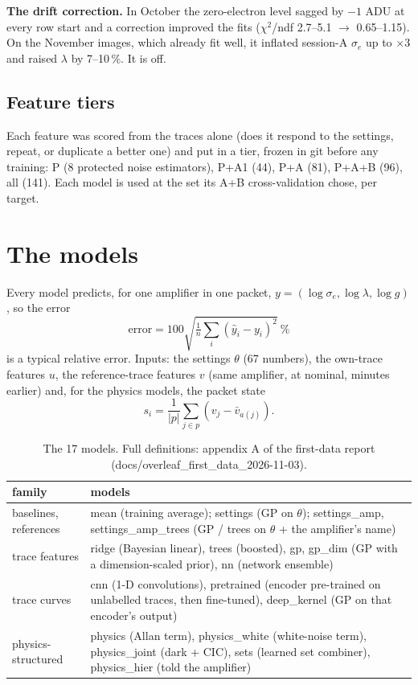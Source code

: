 \documentclass[11pt]{article}
\begin{document}
\textbf{The drift correction.} In October the zero-electron level sagged by $-1$ ADU at every row start and a
correction improved the fits ($\chi^2$/ndf 2.7--5.1 $\to$ 0.65--1.15). On the November images, which already fit well,
it inflated session-A $\sigma_e$ up to $\times3$ and raised $\lambda$ by 7--10\,\%. It is off.

\subsection{Feature tiers}
Each feature was scored from the traces alone (does it respond to the settings, repeat, or duplicate a better one) and
put in a tier, frozen in git before any training: P (8 protected noise estimators), P+A1 (44), P+A (81), P+A+B (96),
all (141). Each model is used at the set its A+B cross-validation chose, per target.

\section{The models}

Every model predicts, for one amplifier in one packet, $y=(\log\sigma_e,\log\lambda,\log g)$, so the error
\[\mathrm{error}=100\sqrt{\tfrac1n\textstyle\sum_i(\hat y_i-y_i)^2}\ \%\]
is a typical relative error. Inputs: the settings $\theta$ (67
numbers), the own-trace features $u$, the reference-trace features $v$ (same amplifier, at nominal, minutes earlier)
and, for the physics models, the packet state
\[s_i=\frac{1}{|p|}\sum_{j\in p}\left(v_j-\bar v_{a(j)}\right).\]

\begin{table}[h]
\centering\small
\begin{tabular}{p{3.6cm}p{11.6cm}}\toprule
family & models\\\midrule
baselines, references & mean (training average); settings (GP on $\theta$); settings\_amp, settings\_amp\_trees (GP / trees on $\theta$ + the amplifier's name)\\
trace features & ridge (Bayesian linear), trees (boosted), gp, gp\_dim (GP with a dimension-scaled prior), nn (network ensemble)\\
trace curves & cnn (1-D convolutions), pretrained (encoder pre-trained on unlabelled traces, then fine-tuned), deep\_kernel (GP on that encoder's output)\\
physics-structured & physics (Allan term), physics\_white (white-noise term), physics\_joint (dark + CIC), sets (learned set combiner), physics\_hier (told the amplifier)\\\bottomrule
\end{tabular}
\caption{The 17 models. Full definitions: appendix A of the first-data report (docs/overleaf\_first\_data\_2026-11-03).}
\end{table}
\end{document}
